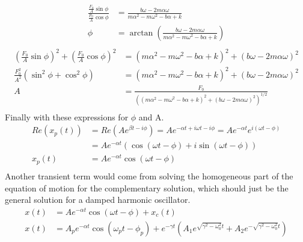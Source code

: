 \documentclass[]{article}
\begin{document}
	\begin{equation}
		\begin{split}
			\frac{\frac{F_0}{A} \sin \phi}{\frac{F_0}{A} \cos \phi} &= \frac{b\omega - 2m\alpha \omega}{m\alpha^2 - m\omega^2 - b\alpha + k} \\
			\phi &= \arctan \left( \frac{b\omega - 2m\alpha \omega}{m\alpha^2 - m\omega^2 - b\alpha + k} \right) \\
		\end{split}
	\end{equation}
	\begin{equation}
		\begin{split}
			\left( \frac{F_0}{A} \sin \phi \right)^2 + \left( \frac{F_0}{A} \cos \phi \right)^2 &= (m\alpha^2 - m\omega^2 - b\alpha + k )^2 + ( b\omega - 2m\alpha \omega)^2 \\
			\frac{F_0^2}{A^2} ( \sin^2 \phi + \cos^2 \phi) &= (m\alpha^2 - m\omega^2 - b\alpha + k )^2 + ( b\omega - 2m\alpha \omega)^2 \\
			A &= \frac{F_0}{ \left( (m\alpha^2 - m\omega^2 - b\alpha + k )^2 + ( b\omega - 2m\alpha \omega)^2 \right)^{1/2} } \\
		\end{split}
	\end{equation}
	Finally with these expressions for $ \phi $ and A.
	\begin{equation}
		\begin{split}
			Re(x_p(t)) &= Re(Ae^{\beta t - i \phi}) = Ae^{-\alpha t + i \omega t - i \phi} = Ae^{-\alpha t} e^ {i(\omega t - \phi)} \\
			&= Ae^{-\alpha t} ( \cos ( \omega t - \phi ) + i\sin ( \omega t - \phi ) ) \\
			x_p(t) &= Ae^{-\alpha t} \cos(\omega t - \phi) \\
		\end{split}
	\end{equation}
	Another transient term would come from solving the homogeneous part of the equation of motion for the complementary solution, which should just be the general solution for a damped harmonic oscillator.
	\begin{equation}
		\begin{split}
			x(t) &= Ae^{-\alpha t} \cos(\omega t - \phi) + x_c(t) \\
			x(t) &= A_pe^{-\alpha t} \cos(\omega_p t - \phi_p) + e^{-\gamma t} \left( A_1 e^{\sqrt{ \gamma^2 - \omega_0^2 } t} + A_2 e^{-\sqrt{ \gamma^2 - \omega_0^2 } t} \right) \\
		\end{split}
	\end{equation}
\end{document}
